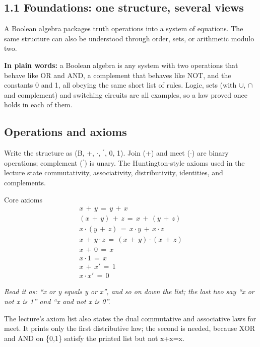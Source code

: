 \documentclass[11pt]{article}
\begin{document}
\begin{keepsection}
\section{1.1 Foundations: one structure, several views}

A Boolean algebra packages truth operations into a system of equations. The same structure can also be understood through order, sets, or arithmetic modulo two.

\begin{plainbox}\textbf{In plain words:} a Boolean algebra is any system with two operations that behave like OR and AND, a complement that behaves like NOT, and the constants 0 and 1, all obeying the same short list of rules. Logic, sets (with \ensuremath{\cup}, \ensuremath{\cap} and complement) and switching circuits are all examples, so a law proved once holds in each of them.\end{plainbox}

\begin{keepsection}
\subsection{Operations and axioms}

Write the structure as (B, +, \ensuremath{\cdot}, \ensuremath{{}^{\prime}}, 0, 1). Join (+) and meet (\ensuremath{\cdot}) are binary operations; complement (\ensuremath{{}^{\prime}}) is unary. The Huntington-style axioms used in the lecture state commutativity, associativity, distributivity, identities, and complements.

\begin{equationcard}{Core axioms}
\[ \begin{gathered} {x}\, +\, {y}\, =\, {y}\, +\, {x} \\ ({x}\, +\, {y})\, +\, {z}\, =\, {x}\, +\, ({y}\, +\, {z}) \\ {x}\cdot ({y}\, +\, {z})\, =\, {x}\cdot {y}\, +\, {x}\cdot {z} \\ {x}\, +\, {y}\cdot {z}\, =\, ({x}\, +\, {y})\cdot ({x}\, +\, {z}) \\ {x}\, +\, 0\, =\, {x} \\ {x}\cdot 1\, =\, {x} \\ {x}\, +\, {x}'\, =\, 1 \\ {x}\cdot {x}'\, =\, 0 \end{gathered} \]
{\small \emph{Read it as: “x or y equals y or x”, and so on down the list; the last two say “x or not x is 1” and “x and not x is 0”.}\par The lecture’s axiom list also states the dual commutative and associative laws for meet. It prints only the first distributive law; the second is needed, because XOR and AND on \{0,1\} satisfy the printed list but not x+x=x.}
\end{equationcard}


\end{keepsection}
\end{keepsection}
\end{document}
